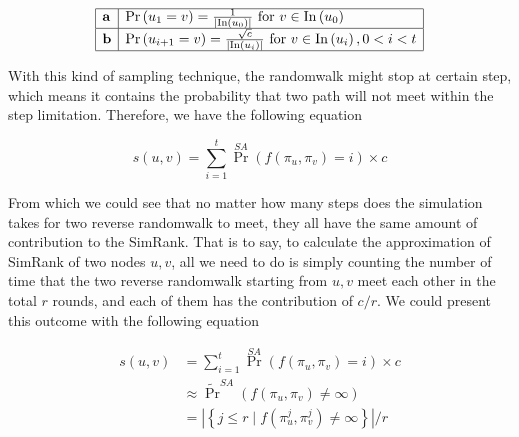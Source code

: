 \documentclass[a4paper, 12pt]{article} %
\begin{document}
    \begin{equation}
        \begin{array}{|l|l|}
            \hline \mathbf{a} & \operatorname{Pr}\left(u_{1}=v\right)=\frac{1}{\left|\operatorname{In}\left(u_{0}\right)\right|} \text { for } v \in \operatorname{In}\left(u_{0}\right) \\
            \hline \mathbf{b} & \operatorname{Pr}\left(u_{i+1}=v\right)=\frac{\sqrt{c}}{\left|\operatorname{In}\left(u_{i}\right)\right|} \text { for } v \in \operatorname{In}\left(u_{i}\right), 0<i<t \\
        \hline
        \end{array}
    \end{equation}
    
    With this kind of sampling technique, the randomwalk might stop at certain step, which means it contains the probability that two path will not meet within the step limitation. Therefore, we have the following equation
    
    \begin{equation}
        s(u, v)=\sum_{i=1}^{t} \operatorname{Pr}^{S A}\left(f\left(\pi_{u}, \pi_{v}\right)=i\right) \times c
    \end{equation}
    
    From which we could see that no matter how many steps does the simulation takes for two reverse randomwalk to meet, they all have the same amount of contribution to the SimRank. That is to say, to calculate the approximation of SimRank of two nodes $u, v$, all we need to do is simply counting the number of time that the two reverse randomwalk starting from $u, v$ meet each other in the total $r$ rounds, and each of them has the contribution of $c / r$. We could present this outcome with the following equation
    
    \begin{equation}
        \begin{split}
            s(u, v) &= \sum_{i=1}^{t} \operatorname{Pr}^{S A}\left(f\left(\pi_{u}, \pi_{v}\right)=i\right) \times c \\
            & \approx \widetilde{\operatorname{Pr}}^{S A}\left(f\left(\pi_{u}, \pi_{v}\right) \neq \infty\right) \\
            &= \left|\left\{j \leq r \mid f\left(\pi_{u}^{j}, \pi_{v}^{j}\right) \neq \infty\right\}\right| / r \\
        \end{split}
    \end{equation}
    
\end{document}
